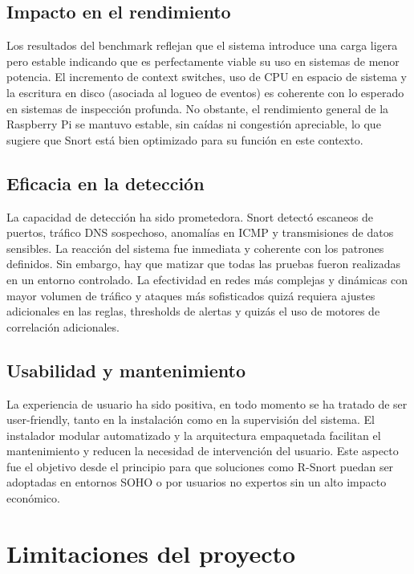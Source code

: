 \documentclass[11pt,a4paper,twoside]{report}
\begin{document}
\subsection*{Impacto en el rendimiento}

Los resultados del benchmark reflejan que el sistema introduce una carga ligera pero estable indicando que es perfectamente viable su uso en sistemas de menor potencia. El incremento de context switches, uso de CPU en espacio de sistema y la escritura en disco (asociada al logueo de eventos) es coherente con lo esperado en sistemas de inspección profunda. No obstante, el rendimiento general de la Raspberry Pi se mantuvo estable, sin caídas ni congestión apreciable, lo que sugiere que Snort está bien optimizado para su función en este contexto.

\subsection*{Eficacia en la detección}

La capacidad de detección ha sido prometedora. Snort detectó escaneos de puertos, tráfico DNS sospechoso, anomalías en ICMP y transmisiones de datos sensibles. La reacción del sistema fue inmediata y coherente con los patrones definidos. Sin embargo, hay que matizar que todas las pruebas fueron realizadas en un entorno controlado. La efectividad en redes más complejas y dinámicas con mayor volumen de tráfico y ataques más sofisticados quizá requiera ajustes adicionales en las reglas, thresholds de alertas y quizás el uso de motores de correlación adicionales.

\subsection*{Usabilidad y mantenimiento}

La experiencia de usuario ha sido positiva, en todo momento se ha tratado de ser user-friendly, tanto en la instalación como en la supervisión del sistema. El instalador modular automatizado y la arquitectura empaquetada facilitan el mantenimiento y reducen la necesidad de intervención del usuario. Este aspecto fue el objetivo desde el principio para que soluciones como R-Snort puedan ser adoptadas en entornos SOHO o por usuarios no expertos sin un alto impacto económico.

\section{Limitaciones del proyecto}
\end{document}
